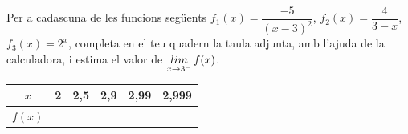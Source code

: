 \pagebreak

\begin{mylist}
	
	\exer Per a cadascuna de les funcions següents $f_1(x)=\dfrac{-5}{(x-3)^2}$, $f_2(x)=\dfrac{4}{3-x}$, \linebreak $f_3(x)=2^x$, completa en el teu quadern la taula adjunta, amb l'ajuda de la calculadora, i estima el valor de $\mathop{lim}\limits_{x\to 3^-} f(x)$.
	
	\begin{center}
		\begin{tabular}{|c|c|c|c|c|c|}
			\hline
			$x$ & 2 & 2,5 & 2,9 & 2,99 & 2,999 \\ \hline
			$f(x)$ & & & & & \\ \hline
		\end{tabular}
	\end{center}




\end{mylist}
